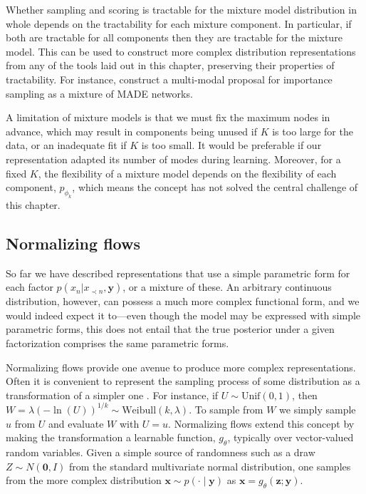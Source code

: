 Whether sampling and scoring is tractable for the mixture model distribution in whole depends on the tractability for each mixture component. In particular, if both are tractable for all components then they are tractable for the mixture model. This can be used to construct more complex distribution representations from any of the tools laid out in this chapter, preserving their properties of tractability. For instance, \citet{PaigeWood2016} construct a multi-modal proposal for importance sampling as a mixture of MADE networks.

A limitation of mixture models is that we must fix the maximum nodes in advance, which may result in components being unused if $K$ is too large for the data, or an inadequate fit if $K$ is too small. It would be preferable if our representation adapted its number of modes during learning. Moreover, for a fixed $K$, the flexibility of a mixture model depends on the flexibility of each component, $p_{\phi_k}$, which means the concept has not solved the central challenge of this chapter.

\subsection{Normalizing flows}\label{sec:normalizing-flows}
So far we have described representations that use a simple parametric form for each factor $p(x_n|x_{\prec n},\mathbf{y})$, or a mixture of these. An arbitrary continuous distribution, however, can possess a much more complex functional form, and we would indeed expect it to---even though the model may be expressed with simple parametric forms, this does not entail that the true posterior under a given factorization comprises the same parametric forms.

Normalizing flows provide one avenue to produce more complex representations. Often it is convenient to represent the sampling process of some distribution as a transformation of a simpler one \citep{tabak2013family, RezendeMohamed2015}. For instance, if $U\sim\text{Unif}(0,1)$, then $W=\lambda(-\ln(U))^{1/k}\sim\text{Weibull}(k,\lambda)$. To sample from $W$ we simply sample $u$ from $U$ and evaluate $W$ with $U=u$. Normalizing flows extend this concept by making the transformation a learnable function, $g_\theta$, typically over vector-valued random variables. Given a simple source of randomness such as a draw $Z\sim N(\mathbf{0},I)$ from the standard multivariate normal distribution, one samples from the more complex distribution $\mathbf{x}\sim p(\cdot\mid\mathbf{y})$ as $\mathbf{x}=g_\theta(\mathbf{z}; \mathbf{y})$.

